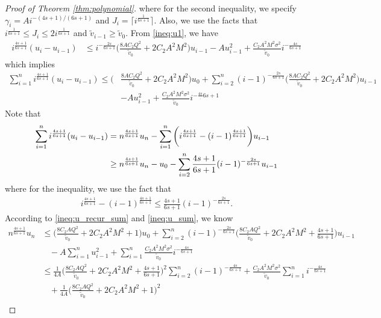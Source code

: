 \begin{proof}[Proof of Theorem \ref{thm:polynomial}]
where for the second inequality, we specify $\gamma_i = Ai^{-(4s+1)/(6s+1)}$ and $J_i = \lceil i^{\frac{1}{6s+1}} \rceil$. Also, we use the facts that $i^{\frac{1}{6s+1}} \leq J_i \leq 2i^{\frac{1}{6s+1}}$ and $\tilde v_{i-1}\geq \tilde v_0$. From \eqref{ineq:u1}, we have
\begin{align}
    i^{\frac{4s+1}{6s+1}}(u_i - u_{i-1}) &\leq i^{-\frac{2s}{6s+1}}\bigg(\frac{8AC_2Q^2}{\tilde v_0 } + 2C_2A^2M^2 \bigg)u_{i-1} - Au_{i-1}^2 + \frac{C_2A^2M^2\sigma^2}{\tilde v_0} i^{-\frac{4s}{6s+1}}\label{ineq:u_recur}
\end{align}
which implies
\begin{align}
    \sum_{i=1}^ni^{\frac{4s+1}{6s+1}}(u_i - u_{i-1}) \leq \bigg(&\frac{8AC_2Q^2}{\tilde v_0 } + 2C_2A^2M^2 \bigg)u_0 +  \sum_{i=2}^n (i-1)^{-\frac{2s}{6s+1}}\bigg(\frac{8AC_2Q^2}{\tilde v_0 } + 2C_2A^2M^2 \bigg)u_{i-1} \\
    &- Au_{i-1}^2 + \frac{C_2A^2M^2\sigma^2}{\tilde v_0} i^{-\frac{4s}.{6s+1}}\label{ineq:u_recur_sum}
\end{align}
Note that 
\begin{align}
    \sum_{i=1}^n i^{\frac{4s+1}{6s+1}}(u_i - u_{i-1}) &= n^{\frac{4s+1}{6s+1}}u_n - \sum_{i=1}^n \bigg(i^{\frac{4s+1}{6s+1}} - (i-1)^{\frac{4s+1}{6s+1}}\bigg)u_{i-1}\notag\\
    & \geq n^{\frac{4s+1}{6s+1}}u_n - u_0 - \sum_{i=2}^n \frac{4s+1}{6s+1}(i-1)^{-\frac{2s}{6s+1}}  u_{i-1} \label{ineq:u_sum} 
\end{align}
where for the inequality, we use the fact that
\begin{align*}
    i^{\frac{4s+1}{6s+1}} - (i-1)^{\frac{4s+1}{6s+1}} \leq  \frac{4s+1}{6s+1}(i-1)^{-\frac{2s}{6s+1}}.
\end{align*}
According to \eqref{ineq:u_recur_sum} and  \eqref{ineq:u_sum}, we know
\begin{align}
    n^{\frac{4s+1}{6s+1}}u_n &\leq \bigg(\frac{8C_2AQ^2}{\tilde v_0} + 2C_2A^2M^2 + 1 \bigg)u_0 +  \sum_{i=2}^n (i-1)^{-\frac{2s}{6s+1}}\bigg(\frac{8C_2AQ^2}{\tilde v_0} + 2C_2A^2M^2 + \frac{4s+1}{6s+1} \bigg)u_{i-1} \\&~~~~-A\sum_{i=1}^n u_{i-1}^2 + \sum_{i=1}^n\frac{C_2A^2M^2\sigma^2}{\tilde v_0} i^{-\frac{4s}{6s+1}}\\
    &\leq \frac{1}{4A} \bigg(\frac{8C_2AQ^2}{\tilde v_0} + 2C_2A^2M^2+\frac{4s+1}{6s+1} \bigg)^2   \sum_{i=2}^n (i-1)^{-\frac{4s}{6s+1}} + \frac{C_2A^2M^2\sigma^2}{\tilde v_0}\sum_{i=1}^n i^{-\frac{4s}{6s+1}} \\&~~~~+ \frac{1}{4A} \bigg(\frac{8C_2AQ^2}{\tilde v_0} + 2C_2A^2M^2+1 \bigg)^2\\

\end{align}
\end{proof}
